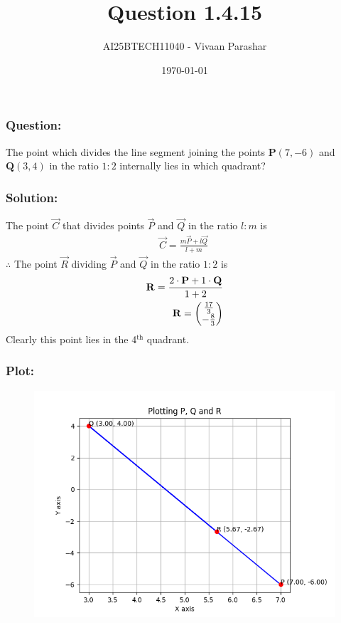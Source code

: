 \documentclass{beamer}
\title{Question 1.4.15}
\author{AI25BTECH11040 - Vivaan Parashar}
\date{\today}
\begin{document}
\frame{\titlepage}

\begin{frame}
    \frametitle{Question: }
    The point which divides the line segment joining the points $\mathbf{P}(7, -6)$ and $\mathbf{Q}(3, 4)$ in the ratio $1 : 2$ internally lies in which quadrant?
\end{frame}

\begin{frame}
    \frametitle{Solution: }
    The point $\vec{C}$ that divides points $\vec{P}$ and $\vec{Q}$ in the ratio $l : m$ is
    \begin{align}
        \vec{C} = \frac{m\vec{P} + l\vec{Q}}{l+m}\
    \end{align}
    $\therefore$ The point $\vec{R}$ dividing $\vec{P}$ and $\vec{Q}$ in the ratio $1:2$ is
    \begin{align}
        \mathbf{R} = \frac{2\cdot\mathbf{P}+1\cdot\mathbf{Q}}{1+2} \\
        \mathbf{R} = \begin{pmatrix}\frac{17}{3}                     \\ -\frac{8}{3}\end{pmatrix}
    \end{align}
    Clearly this point lies in the 4$^\text{th}$ quadrant.
\end{frame}

\begin{frame}
    \frametitle{Plot: }
    \begin{figure}
        \includegraphics[scale=0.5]{figs/plot.png}
    \end{figure}
\end{frame}
\end{document}
